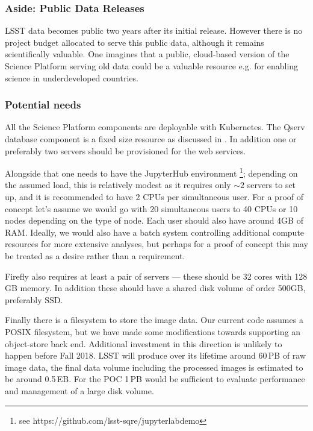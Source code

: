 \subsubsection{Aside: Public Data Releases}

LSST data becomes public two years after its initial release.
However there is no project budget allocated to serve this public data, although it remains scientifically valuable.
One imagines that a public, cloud-based version of the Science Platform serving old data could be a valuable resource e.g. for enabling science in underdeveloped countries.

\subsubsection{Potential needs}

All the Science Platform components are deployable with Kubernetes.
The Qserv database component is a fixed size resource as discussed in .
In addition one or preferably two servers should be provisioned for the web services.

Alongside that one needs to have the JupyterHub environment \footnote{see https://github.com/lsst-sqre/jupyterlabdemo}; depending on the assumed load, this is relatively modest as it requires only $\sim2$ servers to set up, and it is recommended to have 2 CPUs per simultaneous user.
For a proof of concept let's assume we would go with 20 simultaneous users to 40 CPUs or 10 nodes depending on the type of node.
Each user should also have around 4GB of RAM.
Ideally, we would also have a batch system controlling additional compute resources for more extensive analyses, but perhaps for a proof of concept this may be treated as a desire rather than a requirement.

Firefly also requires at least a pair of servers — these should be 32 cores
with 128 GB memory. In addition these should have a shared disk volume of order 500GB, preferably SSD.

Finally there is a filesystem to store the image data.
Our current code assumes a POSIX filesystem, but we have made some modifications towards supporting an object-store back end.
Additional investment in this direction is unlikely to happen before Fall 2018.
LSST will produce over its lifetime around 60\,PB of raw image data, the final data volume including the processed images is estimated to be around 0.5\,EB.
For the POC 1\,PB would be sufficient to evaluate performance and management of a large disk volume.


